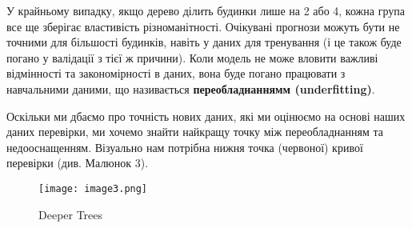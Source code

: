 У крайньому випадку, якщо дерево ділить будинки лише на 2 або 4, кожна група все ще зберігає властивість різноманітності.
Очікувані прогнози можуть бути не точними для більшості будинків, навіть у даних для тренування (і це також буде погано у валідації з тієї ж причини).
Коли модель не може вловити важливі відмінності та закономірності в даних, вона буде погано працювати з навчальними даними, що називається \textbf{переобладнаннямм (underfitting)}.

Оскільки ми дбаємо про точність нових даних, які ми оцінюємо на основі наших даних перевірки, ми хочемо знайти найкращу точку між переобладнанням та недооснащенням.
Візуально нам потрібна нижня точка (червоної) кривої перевірки (див. Малюнок 3).

\begin{figure}
    \label{fig:image3}
    \centering
    \texttt{[image: image3.png]}

    Deeper Trees
\end{figure}
